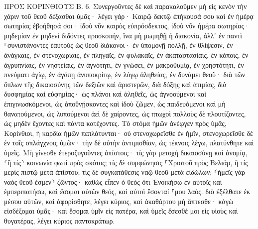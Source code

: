 \documentclass[twoside, 9pt]{extreport}
\begin{document}
ΠΡΟΣ ΚΟΡΙΝΘΙΟΥΣ Β.
6.
Συνεργοῦντες δὲ καὶ παρακαλοῦμεν μὴ εἰς κενὸν τὴν χάριν τοῦ θεοῦ δέξασθαι ὑμᾶς· 
λέγει γάρ· Καιρῷ δεκτῷ ἐπήκουσά σου καὶ ἐν ἡμέρᾳ σωτηρίας ἐβοήθησά σοι· ἰδοὺ νῦν καιρὸς εὐπρόσδεκτος, ἰδοὺ νῦν ἡμέρα σωτηρίας· 
μηδεμίαν ἐν μηδενὶ διδόντες προσκοπήν, ἵνα μὴ μωμηθῇ ἡ διακονία, 
ἀλλ᾽ ἐν παντὶ ⸀συνιστάνοντες ἑαυτοὺς ὡς θεοῦ διάκονοι· ἐν ὑπομονῇ πολλῇ, ἐν θλίψεσιν, ἐν ἀνάγκαις, ἐν στενοχωρίαις, 
ἐν πληγαῖς, ἐν φυλακαῖς, ἐν ἀκαταστασίαις, ἐν κόποις, ἐν ἀγρυπνίαις, ἐν νηστείαις, 
ἐν ἁγνότητι, ἐν γνώσει, ἐν μακροθυμίᾳ, ἐν χρηστότητι, ἐν πνεύματι ἁγίῳ, ἐν ἀγάπῃ ἀνυποκρίτῳ, 
ἐν λόγῳ ἀληθείας, ἐν δυνάμει θεοῦ· διὰ τῶν ὅπλων τῆς δικαιοσύνης τῶν δεξιῶν καὶ ἀριστερῶν, 
διὰ δόξης καὶ ἀτιμίας, διὰ δυσφημίας καὶ εὐφημίας· ὡς πλάνοι καὶ ἀληθεῖς, 
ὡς ἀγνοούμενοι καὶ ἐπιγινωσκόμενοι, ὡς ἀποθνῄσκοντες καὶ ἰδοὺ ζῶμεν, ὡς παιδευόμενοι καὶ μὴ θανατούμενοι, 
ὡς λυπούμενοι ἀεὶ δὲ χαίροντες, ὡς πτωχοὶ πολλοὺς δὲ πλουτίζοντες, ὡς μηδὲν ἔχοντες καὶ πάντα κατέχοντες. 
Τὸ στόμα ἡμῶν ἀνέῳγεν πρὸς ὑμᾶς, Κορίνθιοι, ἡ καρδία ἡμῶν πεπλάτυνται· 
οὐ στενοχωρεῖσθε ἐν ἡμῖν, στενοχωρεῖσθε δὲ ἐν τοῖς σπλάγχνοις ὑμῶν· 
τὴν δὲ αὐτὴν ἀντιμισθίαν, ὡς τέκνοις λέγω, πλατύνθητε καὶ ὑμεῖς. 
Μὴ γίνεσθε ἑτεροζυγοῦντες ἀπίστοις· τίς γὰρ μετοχὴ δικαιοσύνῃ καὶ ἀνομίᾳ, ⸂ἢ τίς⸃ κοινωνία φωτὶ πρὸς σκότος; 
τίς δὲ συμφώνησις ⸀Χριστοῦ πρὸς Βελιάρ, ἢ τίς μερὶς πιστῷ μετὰ ἀπίστου; 
τίς δὲ συγκατάθεσις ναῷ θεοῦ μετὰ εἰδώλων; ⸂ἡμεῖς γὰρ ναὸς θεοῦ ἐσμεν⸃ ζῶντος· καθὼς εἶπεν ὁ θεὸς ὅτι Ἐνοικήσω ἐν αὐτοῖς καὶ ἐμπεριπατήσω, καὶ ἔσομαι αὐτῶν θεός, καὶ αὐτοὶ ἔσονταί ⸀μου λαός. 
διὸ ἐξέλθατε ἐκ μέσου αὐτῶν, καὶ ἀφορίσθητε, λέγει κύριος, καὶ ἀκαθάρτου μὴ ἅπτεσθε· κἀγὼ εἰσδέξομαι ὑμᾶς· 
καὶ ἔσομαι ὑμῖν εἰς πατέρα, καὶ ὑμεῖς ἔσεσθέ μοι εἰς υἱοὺς καὶ θυγατέρας, λέγει κύριος παντοκράτωρ. 
\end{document}
